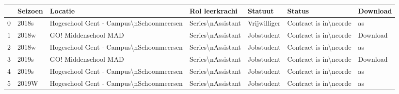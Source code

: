 \begin{tabular}{lllllll}
\toprule
{} & Seizoen &                                  Locatie &     Rol leerkrachi &       Statuut &                 Status &  Download \\
\midrule
0 &   2018s &  Hogeschool Gent - Campus\textbackslash nSchoonmeersen &  Series\textbackslash nAssistant &  Vrijwilliger &  Contract is in\textbackslash ncorde &        as \\
1 &   2018w &                     GO! Middenschool MAD &  Series\textbackslash nAssistant &    Jobstudent &  Contract is in\textbackslash ncorde &  Download \\
2 &   2018w &  Hogeschool Gent - Campus\textbackslash nSchoonmeersen &  Series\textbackslash nAssistant &    Jobstudent &  Contract is in\textbackslash ncorde &        as \\
3 &   2019s &                     GO! Middenschool MAD &  Series\textbackslash nAssistant &    Jobstudent &  Contract is in\textbackslash ncorde &  Download \\
4 &   2019s &  Hogeschool Gent - Campus\textbackslash nSchoonmeersen &  Series\textbackslash nAssistant &    Jobstudent &  Contract is in\textbackslash ncorde &        as \\
5 &   2019W &  Hogeschool Gent - Campus\textbackslash nSchoonmeersen &  Series\textbackslash nAssistant &    Jobstudent &  Contract is in\textbackslash ncorde &        as \\
\bottomrule
\end{tabular}
